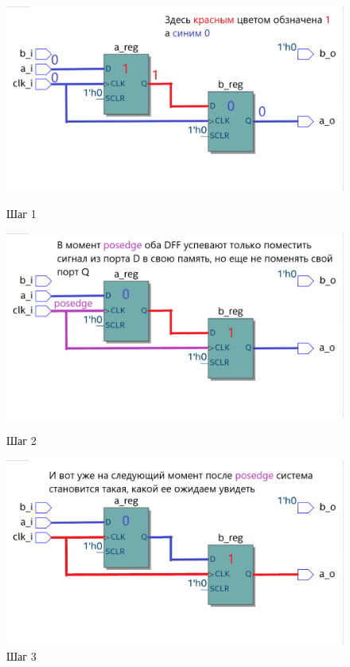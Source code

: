 \documentclass[a4paper,12pt]{article} %
\begin{document}
\begin{figure}[H]
    \centering
    \begin{minipage}[t]{0.32\textwidth}
        \centering
        \includegraphics[width=\linewidth]{Learning/RTL1.png}
        \caption{Шаг 1}
        \label{fig:rtl1}
    \end{minipage}
    \hfill
    \begin{minipage}[t]{0.32\textwidth}
        \centering
        \includegraphics[width=\linewidth]{Learning/RTL2.png}
        \caption{Шаг 2}
        \label{fig:rtl2}
    \end{minipage}
    \hfill
    \begin{minipage}[t]{0.32\textwidth}
        \centering
        \includegraphics[width=\linewidth]{Learning/RTL3.png}
        \caption{Шаг 3}
        \label{fig:rtl3}
    \end{minipage}
\end{figure}
\end{document}

